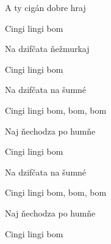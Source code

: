 \begin{song}
\bigskip

A ty cigán dobre hraj \par
{}Cingi lingi bom \par
{}Na dzifčata ňežmurkaj \par
{}Cingi lingi bom \par

\bigskip

Na dzifčata na šumné \par
{}Cingi lingi bom, bom, bom \par
{}Naj ňechodza po humňe \par
{}Cingi lingi bom \par
{}Na dzifčata na šumné \par
{}Cingi lingi bom, bom, bom \par
{}Naj ňechodza po humňe \par
{}Cingi lingi bom \par

\end{song}
